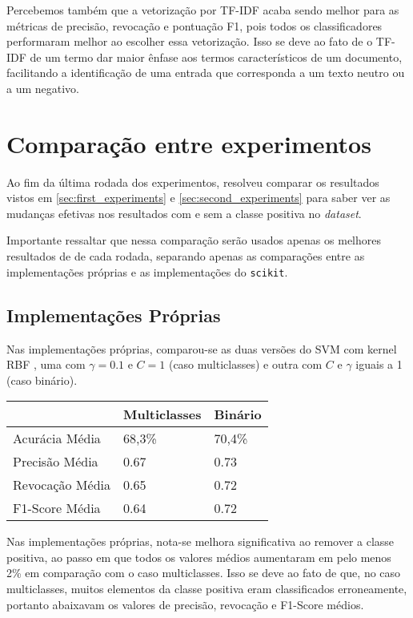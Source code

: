 Percebemos também que a vetorização por TF-IDF acaba sendo melhor para as métricas
de precisão, revocação e pontuação F1, pois todos os classificadores performaram
melhor ao escolher essa vetorização. Isso se deve ao fato de o TF-IDF de um termo
dar maior ênfase aos termos característicos de um documento, facilitando a identificação
de uma entrada que corresponda a um texto neutro ou a um negativo.

\section{Comparação entre experimentos}

Ao fim da última rodada dos experimentos, resolveu comparar os resultados vistos em 
\ref{sec:first_experiments} e \ref{sec:second_experiments} para saber ver as mudanças
efetivas nos resultados com e sem a classe positiva no \textit{dataset}.

Importante ressaltar que nessa comparação serão usados apenas os melhores resultados de
de cada rodada, separando apenas as comparações entre as implementações próprias
e as implementações do \texttt{scikit}.

\subsection{Implementações Próprias}

Nas implementações próprias, comparou-se as duas versões do SVM com kernel RBF
, uma com $\gamma = 0.1$ e $C = 1$ (caso multiclasses) e outra com $C$ e $\gamma$ iguais a 1 (caso 
binário).  

\begin{table}[H]
	\centering
	\begin{tabular}{l l l}
	& Multiclasses & Binário \\
	\hline
	Acurácia Média & 68,3\% & 70,4\% \\
	\hline
	Precisão Média & 0.67 & 0.73 \\
	\hline
	Revocação Média & 0.65 & 0.72 \\
	\hline
	F1-Score Média & 0.64 & 0.72 \\
	\hline
	\end{tabular}
\end{table}

Nas implementações próprias, nota-se melhora significativa ao remover a classe positiva, ao passo
em que todos os valores médios aumentaram em pelo menos 2\% em comparação com o caso multiclasses.
Isso se deve ao fato de que, no caso multiclasses, muitos elementos da classe positiva eram
classificados erroneamente, portanto abaixavam os valores de precisão, revocação e F1-Score médios.

